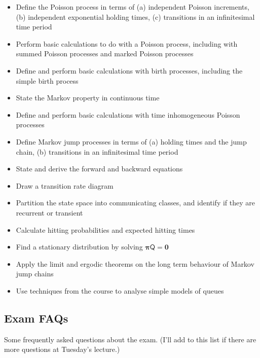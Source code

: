 \documentclass[
  a4paper,
]{article}
\providecommand{\tightlist}{%
  \setlength{\itemsep}{0pt}\setlength{\parskip}{0pt}}
\theoremstyle{definition}
\theoremstyle{definition}
\theoremstyle{definition}
\theoremstyle{remark}
\begin{document}
\begin{itemize}
\tightlist
\item
  Define the Poisson process in terms of (a) independent Poisson increments, (b) independent exponential holding times, (c) transitions in an infinitesimal time period
\item
  Perform basic calculations to do with a Poisson process, including with summed Poisson processes and marked Poisson processes
\item
  Define and perform basic calculations with birth processes, including the simple birth process
\item
  State the Markov property in continuous time
\item
  Define and perform basic calculations with time inhomogeneous Poisson processes
\item
  Define Markov jump processes in terms of (a) holding times and the jump chain, (b) transitions in an infinitesimal time period
\item
  State and derive the forward and backward equations
\item
  Draw a transition rate diagram
\item
  Partition the state space into communicating classes, and identify if they are recurrent or transient
\item
  Calculate hitting probabilities and expected hitting times
\item
  Find a stationary distribution by solving \(\boldsymbol\pi \mathsf Q = \mathbf 0\)
\item
  Apply the limit and ergodic theorems on the long term behaviour of Markov jump chains
\item
  Use techniques from the course to analyse simple models of queues
\end{itemize}

\hypertarget{exam-faqs}{%
\subsection{Exam FAQs}\label{exam-faqs}}

Some frequently asked questions about the exam. (I'll add to this list if there are more questions at Tuesday's lecture.)
\end{document}
